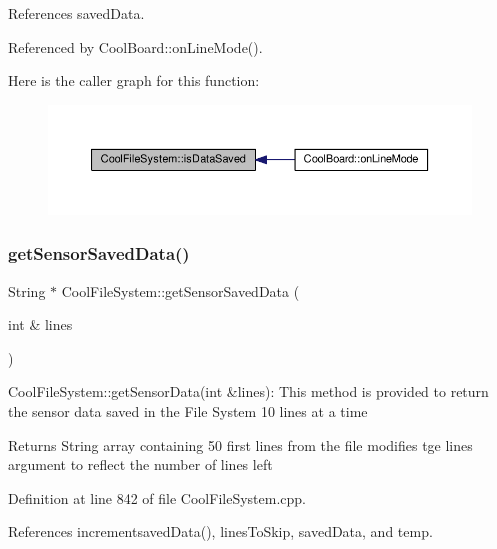 References saved\+Data.



Referenced by Cool\+Board\+::on\+Line\+Mode().

Here is the caller graph for this function\+:\nopagebreak
\begin{figure}[H]
\begin{center}
\leavevmode
\includegraphics[width=350pt]{db/d0c/class_cool_file_system_ac86a40e7c3a1842f7342f698d34324f9_icgraph}
\end{center}
\end{figure}
\mbox{\label{class_cool_file_system_a3223ffff4266a6300988fab956d6b4b2}} 
\subsubsection{\texorpdfstring{get\+Sensor\+Saved\+Data()}{getSensorSavedData()}}
{\footnotesize\ttfamily String $\ast$ Cool\+File\+System\+::get\+Sensor\+Saved\+Data (\begin{DoxyParamCaption}\item[{int \&}]{lines }\end{DoxyParamCaption})}

Cool\+File\+System\+::get\+Sensor\+Data(int \&lines)\+: This method is provided to return the sensor data saved in the File System 10 lines at a time

\begin{DoxyReturn}{Returns}
String array containing 50 first lines from the file modifies tge lines argument to reflect the number of lines left 
\end{DoxyReturn}


Definition at line 842 of file Cool\+File\+System.\+cpp.



References incrementsaved\+Data(), lines\+To\+Skip, saved\+Data, and temp.



